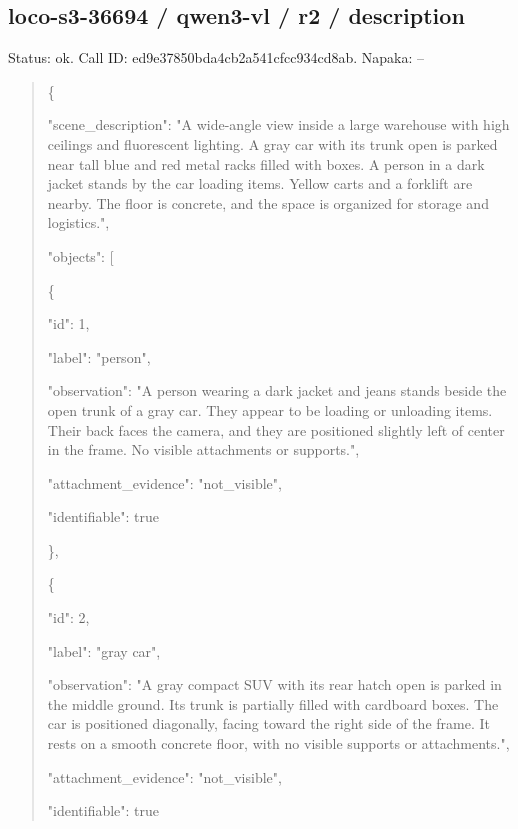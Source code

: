 \documentclass[10pt,a4paper]{article}
\begin{document}
\subsection*{loco-s3-36694 / qwen3-vl / r2 / description}
Status: ok. Call ID: ed9e37850bda4cb2a541cfcc934cd8ab. Napaka: --
\begin{quote}\footnotesize
\{\par
  "scene\_description":\allowbreak{} "A wide-angle view inside a large warehouse with high ceilings and fluorescent lighting. A gray car with its trunk open is parked near tall blue and red metal racks filled with boxes. A person in a dark jacket stands by the car loading items. Yellow carts and a forklift are nearby. The floor is concrete,\allowbreak{} and the space is organized for storage and logistics.",\allowbreak{}\par
  "objects":\allowbreak{} [\par
    \{\par
      "id":\allowbreak{} 1,\allowbreak{}\par
      "label":\allowbreak{} "person",\allowbreak{}\par
      "observation":\allowbreak{} "A person wearing a dark jacket and jeans stands beside the open trunk of a gray car. They appear to be loading or unloading items. Their back faces the camera,\allowbreak{} and they are positioned slightly left of center in the frame. No visible attachments or supports.",\allowbreak{}\par
      "attachment\_evidence":\allowbreak{} "not\_visible",\allowbreak{}\par
      "identifiable":\allowbreak{} true\par
    \},\allowbreak{}\par
    \{\par
      "id":\allowbreak{} 2,\allowbreak{}\par
      "label":\allowbreak{} "gray car",\allowbreak{}\par
      "observation":\allowbreak{} "A gray compact SUV with its rear hatch open is parked in the middle ground. Its trunk is partially filled with cardboard boxes. The car is positioned diagonally,\allowbreak{} facing toward the right side of the frame. It rests on a smooth concrete floor,\allowbreak{} with no visible supports or attachments.",\allowbreak{}\par
      "attachment\_evidence":\allowbreak{} "not\_visible",\allowbreak{}\par
      "identifiable":\allowbreak{} true\par

\end{quote}
\end{document}
